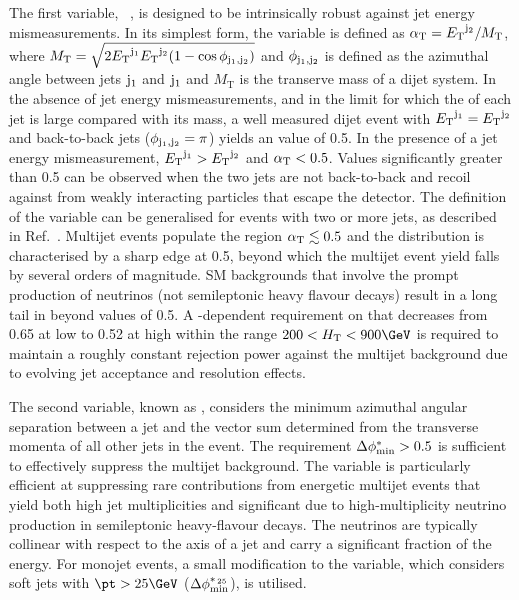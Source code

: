 The first variable, \alphat~\cite{Randall:2008rw, RA1Paper}, is
designed to be intrinsically robust against jet energy
mismeasurements. In its simplest form, the \alphat variable is defined
as $\alpha_{\mathrm{T}} = {E_{\text T}}^{\rm j_2}/M_\text{T}$, where $M_\textrm{T} = \sqrt{
  2 {E_{\text T}}^{\rm j_1} {E_{\text T}}^{\rm j_2} (1 - \cos\phi_{\rm j_1,j_2})}$ and
$\phi_{\rm j_1,j_2}$ is defined as the azimuthal angle between jets
${\rm j_1}$ and ${\rm j_1}$ and $M_\textrm{T}$ is the transerve mass
of a dijet system. In the absence of jet energy mismeasurements, and
in the limit for which the \Et of each jet is large compared with its
mass, a well measured dijet event with ${E_{\text T}}^{\mathrm{j_1}} =
{E_{\text T}}^{\mathrm{j_2}}$ and back-to-back jets ($\phi_{\rm j_1,j_2} = \pi$)
yields an \alphat value of 0.5. In the presence of a jet energy
mismeasurement, ${E_{\text T}}^{\mathrm{j_1}} > {E_{\text T}}^{\mathrm{j_2}}$ and $\alpha_{\mathrm{T}}
< 0.5$. Values significantly greater than 0.5 can be observed when the
two jets are not back-to-back and recoil against \ptvecmiss from
weakly interacting particles that escape the detector. The definition
of the \alphat variable can be generalised for events with two or more
jets, as described in Ref.~\cite{}. Multijet events populate the
region $\alpha_{\mathrm{T}} \lesssim 0.5$ and the \alphat distribution is
characterised by a sharp edge at 0.5, beyond which the multijet event
yield falls by several orders of magnitude. SM backgrounds that
involve the prompt production of neutrinos (\eg not semileptonic heavy
flavour decays) result in a long tail in \alphat beyond values of
0.5. A \scalht-dependent requirement on \alphat that decreases from
0.65 at low \scalht to 0.52 at high \scalht within the range $200 <
\scalht < 900\GeV$ is required to maintain a roughly constant
rejection power against the multijet background due to evolving jet
acceptance and resolution effects.

The second variable, known as \bdphi, considers the minimum azimuthal
angular separation between a jet and the vector sum determined from
the transverse momenta of all other jets in the event. The requirement
$\Delta\phi^{*}_\text{min} > 0.5$ is sufficient to effectively suppress the multijet
background. The \bdphi variable is particularly efficient at
suppressing rare contributions from energetic multijet events that
yield both high jet multiplicities and significant \met due to
high-multiplicity neutrino production in semileptonic heavy-flavour
decays. The neutrinos are typically collinear with respect to the axis
of a jet and carry a significant fraction of the energy. For monojet
events, a small modification to the \bdphi variable, which considers
soft jets with $\pt > 25\GeV$ ($\Delta\phi^{*_{\, 25}}_\text{min}$), is utilised. 

